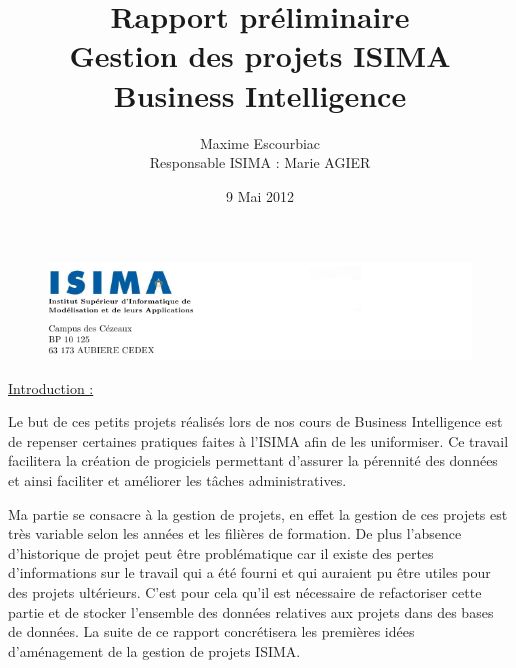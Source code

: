 \documentclass[a4paper,11pt]{report}
\begin{document}
\begin{figure}
   \includegraphics[scale = 0.75]{HeaderPagedeGarde.PNG}
\end{figure}


\author{Maxime Escourbiac \\ Responsable ISIMA : Marie AGIER}
\title{
   Rapport préliminaire \\ Gestion des projets ISIMA \\
  \bigskip
   \large{
     Business Intelligence
   }
}
\date{9 Mai 2012}
\maketitle

\newpage



\tableofcontents
\newpage

\listoffigures
\newpage


\begin{flushleft}
\LARGE{ \underline {Introduction :}\bigskip}
\end{flushleft}

\normalsize{
Le but de ces petits projets réalisés lors de nos cours de Business Intelligence est de repenser certaines pratiques faites à l'ISIMA afin de les uniformiser. Ce travail facilitera la création de progiciels permettant d'assurer la pérennité des données et ainsi faciliter et améliorer les tâches administratives. 
}

\normalsize{
Ma partie se consacre à la gestion de projets, en effet la gestion de ces projets est très variable selon les années et les filières de formation. De plus l'absence d'historique de projet peut être problématique car il existe des pertes d'informations sur le travail qui a été fourni et qui auraient pu être utiles pour des projets ultérieurs. C'est pour cela qu'il est nécessaire de refactoriser cette partie et de stocker l'ensemble des données relatives aux projets dans des bases de données. La suite de ce rapport concrétisera les premières idées d'aménagement de la gestion de projets ISIMA.
}
\end{document}
